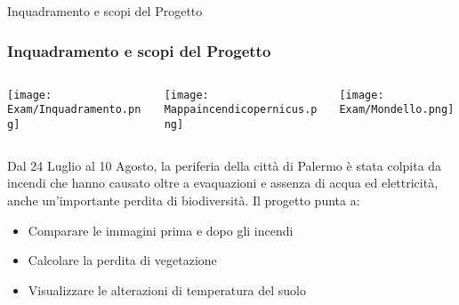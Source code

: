\documentclass{beamer}  %
\begin{document}
\begin{frame}{Inquadramento e scopi del Progetto}
\frametitle{Inquadramento e scopi del Progetto}
\vspace{0.5cm}
\begin{columns}
  \begin{column}{0.20\textwidth} %
    \centering
    \texttt{[image: Exam/Inquadramento.png]} %
  \end{column}
  \begin{column}{0.34\textwidth} %
    \centering
    \texttt{[image: Mappaincendicopernicus.png]} %
  \end{column}
  \begin{column}{0.39\textwidth}  %
    \centering
    \texttt{[image: Exam/Mondello.png]} %
  \end{column} 
\end{columns} %
\vspace{0.5cm}
\small %
Dal 24 Luglio al 10 Agosto, la periferia della città di Palermo è stata colpita da incendi che hanno causato oltre a evaquazioni e assenza di acqua ed elettricità, anche un'importante perdita di biodiversità. Il progetto punta a:
\vspace{0.2cm}
\begin{itemize}
    \item Comparare le immagini prima e dopo gli incendi
    \item Calcolare la perdita di vegetazione
    \item Visualizzare le alterazioni di temperatura del suolo 
\end{itemize}
\end{frame}
\end{document}
